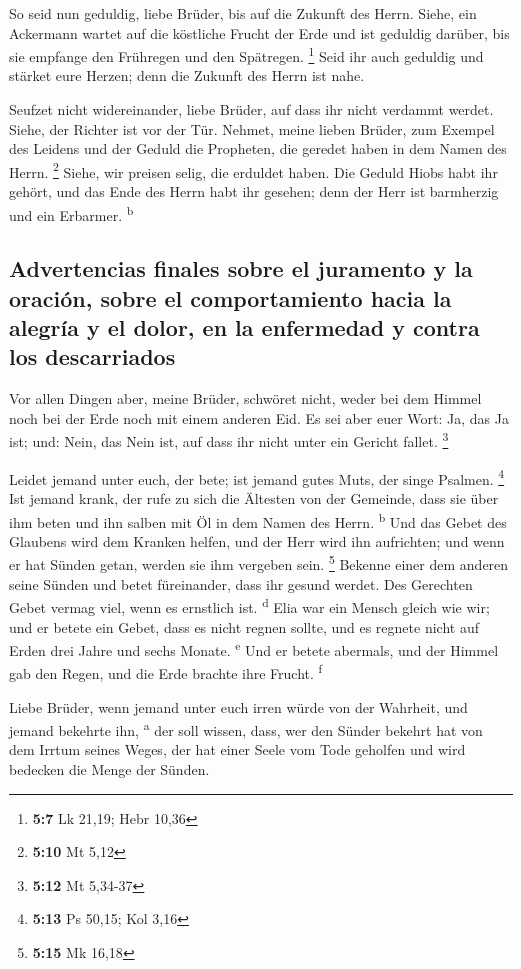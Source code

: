  So seid nun geduldig, liebe Brüder, bis auf die Zukunft
des Herrn. Siehe, ein Ackermann wartet auf die köstliche Frucht der Erde
und ist geduldig darüber, bis sie empfange den Frühregen und den
Spätregen. \footnote{\textbf{5:7} Lk 21,19; Hebr 10,36} 
Seid ihr auch geduldig und stärket eure Herzen; denn die Zukunft des
Herrn ist nahe.

 Seufzet nicht widereinander, liebe Brüder, auf dass ihr
nicht verdammt werdet. Siehe, der Richter ist vor der Tür.
 Nehmet, meine lieben Brüder, zum Exempel des Leidens und
der Geduld die Propheten, die geredet haben in dem Namen des Herrn.
\footnote{\textbf{5:10} Mt 5,12}  Siehe, wir preisen
selig, die erduldet haben. Die Geduld Hiobs habt ihr gehört, und das
Ende des Herrn habt ihr gesehen; denn der Herr ist barmherzig und ein
Erbarmer. \textsuperscript{b}

\hypertarget{advertencias-finales-sobre-el-juramento-y-la-oraciuxf3n-sobre-el-comportamiento-hacia-la-alegruxeda-y-el-dolor-en-la-enfermedad-y-contra-los-descarriados}{%
\subsection{Advertencias finales sobre el juramento y la oración, sobre
el comportamiento hacia la alegría y el dolor, en la enfermedad y contra
los
descarriados}\label{advertencias-finales-sobre-el-juramento-y-la-oraciuxf3n-sobre-el-comportamiento-hacia-la-alegruxeda-y-el-dolor-en-la-enfermedad-y-contra-los-descarriados}}

 Vor allen Dingen aber, meine Brüder, schwöret nicht,
weder bei dem Himmel noch bei der Erde noch mit einem anderen Eid. Es
sei aber euer Wort: Ja, das Ja ist; und: Nein, das Nein ist, auf dass
ihr nicht unter ein Gericht fallet. \footnote{\textbf{5:12} Mt 5,34-37}

 Leidet jemand unter euch, der bete; ist jemand gutes
Muts, der singe Psalmen. \footnote{\textbf{5:13} Ps 50,15; Kol 3,16}
 Ist jemand krank, der rufe zu sich die Ältesten von der
Gemeinde, dass sie über ihm beten und ihn salben mit Öl in dem Namen des
Herrn. \textsuperscript{b}  Und das Gebet des Glaubens
wird dem Kranken helfen, und der Herr wird ihn aufrichten; und wenn er
hat Sünden getan, werden sie ihm vergeben sein. \footnote{\textbf{5:15}
  Mk 16,18}  Bekenne einer dem anderen seine Sünden und
betet füreinander, dass ihr gesund werdet. Des Gerechten Gebet vermag
viel, wenn es ernstlich ist. \textsuperscript{d}  Elia
war ein Mensch gleich wie wir; und er betete ein Gebet, dass es nicht
regnen sollte, und es regnete nicht auf Erden drei Jahre und sechs
Monate. \textsuperscript{e}  Und er betete abermals, und
der Himmel gab den Regen, und die Erde brachte ihre Frucht.
\textsuperscript{f}

 Liebe Brüder, wenn jemand unter euch irren würde von der
Wahrheit, und jemand bekehrte ihn, \textsuperscript{a} 
der soll wissen, dass, wer den Sünder bekehrt hat von dem Irrtum seines
Weges, der hat einer Seele vom Tode geholfen und wird bedecken die Menge
der Sünden.

